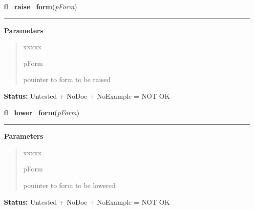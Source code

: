 \hspace{.8\funcindent}\begin{boxedminipage}{\funcwidth}

    \raggedright \textbf{fl\_raise\_form}(\textit{pForm})

    \vspace{-1.5ex}

    \rule{\textwidth}{0.5\fboxrule}
\setlength{\parskip}{2ex}
\setlength{\parskip}{1ex}
      \textbf{Parameters}
      \vspace{-1ex}

      \begin{quote}
        \begin{Ventry}{xxxxx}

          \item[pForm]

          pouinter to form to be raised

        \end{Ventry}

      \end{quote}

\textbf{Status:} Untested + NoDoc + NoExample = NOT OK



    \end{boxedminipage}

    \label{xformslib:library:fl_lower_form}

    \vspace{0.5ex}

\hspace{.8\funcindent}\begin{boxedminipage}{\funcwidth}

    \raggedright \textbf{fl\_lower\_form}(\textit{pForm})

    \vspace{-1.5ex}

    \rule{\textwidth}{0.5\fboxrule}
\setlength{\parskip}{2ex}
\setlength{\parskip}{1ex}
      \textbf{Parameters}
      \vspace{-1ex}

      \begin{quote}
        \begin{Ventry}{xxxxx}

          \item[pForm]

          pouinter to form to be lowered

        \end{Ventry}

      \end{quote}

\textbf{Status:} Untested + NoDoc + NoExample = NOT OK



    \end{boxedminipage}

